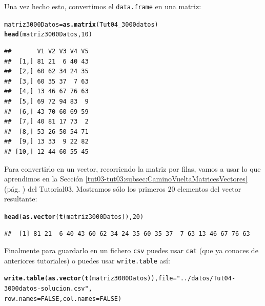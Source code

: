 \documentclass[10pt,a4paper]{article}\usepackage[]{graphicx}\usepackage[]{color}
\makeatletter
\newcommand{\hlnum}[1]{\textcolor[rgb]{0.686,0.059,0.569}{#1}}%
\newcommand{\hlstr}[1]{\textcolor[rgb]{0.192,0.494,0.8}{#1}}%
\newcommand{\hlstd}[1]{\textcolor[rgb]{0.345,0.345,0.345}{#1}}%
\newcommand{\hlkwb}[1]{\textcolor[rgb]{0.69,0.353,0.396}{#1}}%
\newcommand{\hlkwc}[1]{\textcolor[rgb]{0.333,0.667,0.333}{#1}}%
\newcommand{\hlkwd}[1]{\textcolor[rgb]{0.737,0.353,0.396}{\textbf{#1}}}%
\newenvironment{kframe}{%
 \def\at@end@of@kframe{}%
 \ifinner\ifhmode%
  \def\at@end@of@kframe{\end{minipage}}%
  \begin{minipage}{\columnwidth}%
 \fi\fi%
 \def\FrameCommand##1{\hskip\@totalleftmargin \hskip-\fboxsep
 \colorbox{shadecolor}{##1}\hskip-\fboxsep
     \hskip-\linewidth \hskip-\@totalleftmargin \hskip\columnwidth}%
 \MakeFramed {\advance\hsize-\width
   \@totalleftmargin\z@ \linewidth\hsize
   \@setminipage}}%
 {\par\unskip\endMakeFramed%
 \at@end@of@kframe}
\newenvironment{knitrout}{}{} %
\makeatother
\begin{document}
\begin{enumerate}
  Una vez hecho esto, convertimos el {\tt data.frame} en una matriz:
\begin{knitrout}
\color{fgcolor}\begin{kframe}
\begin{alltt}
\hlstd{matriz3000Datos} \hlkwb{=} \hlkwd{as.matrix}\hlstd{(Tut04_3000datos)}
\hlkwd{head}\hlstd{(matriz3000Datos,} \hlnum{10}\hlstd{)}
\end{alltt}
\begin{verbatim}
##       V1 V2 V3 V4 V5
##  [1,] 81 21  6 40 43
##  [2,] 60 62 34 24 35
##  [3,] 60 35 37  7 63
##  [4,] 13 46 67 76 63
##  [5,] 69 72 94 83  9
##  [6,] 43 70 60 69 59
##  [7,] 40 81 17 73  2
##  [8,] 53 26 50 54 71
##  [9,] 13 33  9 22 82
## [10,] 12 44 60 55 45
\end{verbatim}
\end{kframe}
\end{knitrout}
  Para convertirlo en un vector, recorriendo la matriz por filas, vamos a usar lo que aprendimos en la Sección \ref{tut03-tut03:subsec:CaminoVueltaMatricesVectores} (pág. \pageref{tut03-tut03:subsec:CaminoVueltaMatricesVectores}) del Tutorial03. Mostramos sólo los primeros $20$ elementos del vector resultante:
\begin{knitrout}
\color{fgcolor}\begin{kframe}
\begin{alltt}
\hlkwd{head}\hlstd{(}\hlkwd{as.vector}\hlstd{(}\hlkwd{t}\hlstd{(matriz3000Datos)),} \hlnum{20}\hlstd{)}
\end{alltt}
\begin{verbatim}
##  [1] 81 21  6 40 43 60 62 34 24 35 60 35 37  7 63 13 46 67 76 63
\end{verbatim}
\end{kframe}
\end{knitrout}
  Finalmente para guardarlo en un fichero {\tt csv} puedes usar {\tt cat} (que ya conoces de anteriores tutoriales) o puedes usar {\tt write.table} así:
\begin{knitrout}
\color{fgcolor}\begin{kframe}
\begin{alltt}
\hlkwd{write.table}\hlstd{(}\hlkwd{as.vector}\hlstd{(}\hlkwd{t}\hlstd{(matriz3000Datos)),} \hlkwc{file}\hlstd{=}\hlstr{"../datos/Tut04-3000datos-solucion.csv"}\hlstd{,}
        \hlkwc{row.names}\hlstd{=}\hlnum{FALSE}\hlstd{,} \hlkwc{col.names}\hlstd{=}\hlnum{FALSE}\hlstd{)}
\end{alltt}
\end{kframe}
\end{knitrout}

\end{enumerate}
\end{document}
